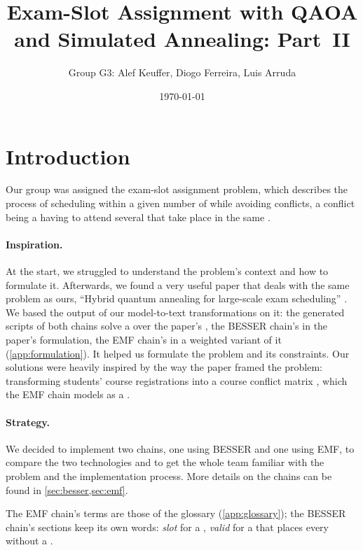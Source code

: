 \documentclass{article}
\title{Exam-Slot Assignment with QAOA and Simulated Annealing: Part~II}
\author{Group G3: Alef Keuffer, Diogo Ferreira, Luis Arruda}
\date{\today}
\begin{document}
\maketitle

\section{Introduction}\label{sec:introduction}

Our group was assigned the exam-slot assignment problem, which describes the process of scheduling 
within a given number of  while avoiding conflicts, a conflict being a  having to attend
several  that take place in the same .

\paragraph{Inspiration.}
At the start, we struggled to understand the problem's context and how to formulate it. Afterwards, we found a
very useful paper that deals with the same problem as ours, \enquote{Hybrid quantum annealing for large-scale exam
scheduling} \cite{Paper}. We based the output of our model-to-text transformations on it: the generated scripts of
both chains solve a  over the paper's  \cite[§5.3, Eq. (4)]{Paper}, the BESSER
chain's in the paper's formulation, the EMF chain's in a weighted variant of it (\cref{app:formulation}). It helped us
formulate the problem and its constraints. Our solutions were heavily inspired by the way the paper framed
the problem: transforming students' course registrations into a course conflict matrix \cite[§5.2]{Paper}, which
the EMF chain models as a .

\paragraph{Strategy.}
We decided to implement two chains, one using BESSER and one using EMF, to compare the two technologies and to get
the whole team familiar with the problem and the implementation process. More details on the chains can be found
in \cref{sec:besser,sec:emf}.

The EMF chain's terms are those of the glossary (\cref{app:glossary}); the BESSER chain's sections keep its
own words: \emph{slot} for a , \emph{valid} for a  that places every  without a .
\end{document}
